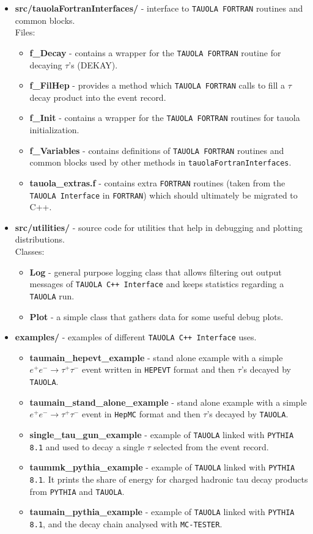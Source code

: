 \documentclass[]{Tauola_interface_design}
\begin{document}
\begin{itemize}
\item {\bf src/tauolaFortranInterfaces/ } -  interface to {\tt TAUOLA FORTRAN} routines and common blocks. \\
  Files:
    \begin{itemize}
    \item { \bf f\_Decay} - contains a wrapper for the {\tt TAUOLA FORTRAN} routine for decaying 
$\tau$'s (DEKAY).
    \item { \bf f\_FilHep } - provides a method which {\tt TAUOLA FORTRAN} calls to fill a $\tau$ decay product into the
      event record.
    \item { \bf f\_Init } - contains a wrapper for the {\tt TAUOLA FORTRAN} routines for tauola initialization.
    \item { \bf f\_Variables } - contains definitions of {\tt TAUOLA FORTRAN} routines and common blocks used by other methods in {\tt tauolaFortranInterfaces}. 
    \item { \bf tauola\_extras.f } - contains extra  {\tt FORTRAN} routines (taken from the {\tt TAUOLA  Interface} in {\tt FORTRAN}) which should ultimately be migrated to C++.
    \end{itemize}

\item {\bf src/utilities/ } - source code for utilities that help in debugging and plotting distributions.\\
  Classes:
  \begin{itemize}
  \item { \bf Log} - general purpose logging class that allows filtering out output messages 
      of {\tt TAUOLA C++ Interface} and keeps statistics regarding a {\tt TAUOLA} run.
  \item { \bf Plot} - a simple class that gathers data for some useful debug plots.
  \end{itemize}   

  \item {\bf examples/ } - examples of different {\tt TAUOLA C++ Interface} uses.
    \begin{itemize}
    \item {\bf taumain\_hepevt\_example} - stand alone example with a simple 
      $e^+e^- \rightarrow \tau^+\tau^-$ event written in {\tt HEPEVT} format
     and then $\tau$'s decayed by {\tt TAUOLA}.
    \item {\bf taumain\_stand\_alone\_example} - stand alone example with a simple 
      $e^+e^- \rightarrow \tau^+\tau^-$ event in  {\tt HepMC} format
     and then $\tau$'s decayed by {\tt TAUOLA}.
    \item {\bf single\_tau\_gun\_example } - example of {\tt TAUOLA} linked with {\tt PYTHIA 8.1} and used to decay a single $\tau$ selected from the event record.
    \item {\bf taummk\_pythia\_example } - example of  {\tt TAUOLA} linked with {\tt PYTHIA 8.1}. It prints the share of energy for charged hadronic tau decay products from {\tt PYTHIA} and {\tt TAUOLA}.
    \item {\bf taumain\_pythia\_example } - example of  {\tt TAUOLA} linked with {\tt PYTHIA 8.1}, and the decay chain  analysed with  {\tt MC-TESTER}.


\end{itemize}
\end{itemize}
\end{document}
